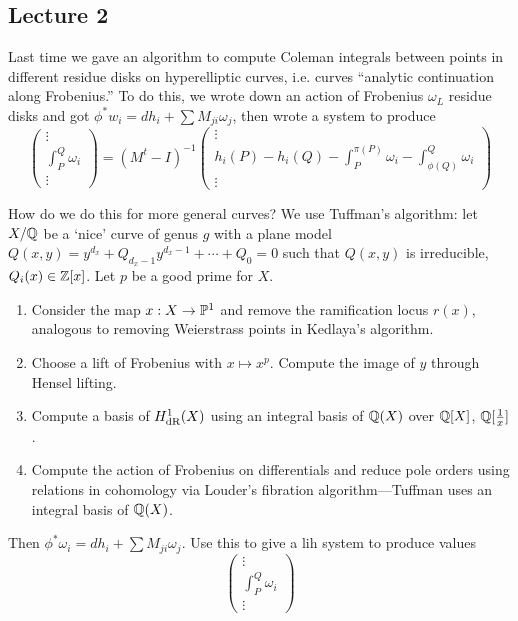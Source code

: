 \newpage
\subsection{Lecture 2}

Last time we gave an algorithm to compute Coleman integrals between points in different residue disks on hyperelliptic curves, i.e. curves ``analytic continuation along Frobenius.'' To do this, we wrote down an action of Frobenius $\omega_L$ residue disks and got $\phi^* w_i= dh_i + \sum M_{ji} \omega_j$, then wrote a system to produce 
	\[
	\begin{pmatrix}
	\vdots \\
	\int_P^Q \omega_i \\
	\vdots
	\end{pmatrix}=
	(M^t - I)^{-1} 
	\begin{pmatrix}
	\vdots \\
	h_i(P) - h_i(Q) - \int_P^{\pi(P)} \omega_i - \int_{\phi(Q)}^Q \omega_i \\
	\vdots
	\end{pmatrix}
	\]


How do we do this for more general curves? We use Tuffman's algorithm: let $X/\Q$ be a `nice' curve of genus $g$ with a plane model $Q(x,y)= y^{d_x} + Q_{d_x-1} y^{d_x-1} + \cdots + Q_0= 0$ such that $Q(x,y)$ is irreducible, $Q_i(x) \in \Z[x]$. Let $p$ be a good prime for $X$.


\begin{enumerate}[1.]
\item Consider the map $x: X \to \P^1$ and remove the ramification locus $r(x)$, analogous to removing Weierstrass points in Kedlaya's algorithm. 
\item Choose a lift of Frobenius with $x \mapsto x^p$. Compute the image of $y$ through Hensel lifting. 
\item Compute a basis of $H_{\dr}^1(X)$ using an integral basis of $\Q(X)$ over $\Q[X]$, $\Q[\frac{1}{x}]$.
\item Compute the action of Frobenius on differentials and reduce pole orders using relations in cohomology via Louder's fibration algorithm---Tuffman uses an integral basis of $\Q(X)$. 
\end{enumerate}


Then $\phi^*\omega_i= dh_i + \sum M_{ji} \omega_j$. Use this to give a lih system to produce values
	\[
	\begin{pmatrix}
	\vdots \\
	\int_P^Q \omega_i \\
	\vdots
	\end{pmatrix}
	\]



